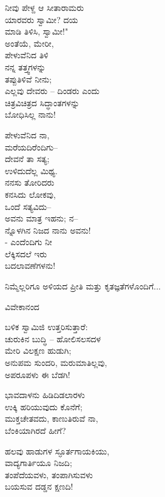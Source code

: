 \begin{myquote}
ನೀವು ಪೇಳ್ದ ಆ ಸೀತಾರಾಮರು\\ಯಾರವರು ಸ್ವಾಮೀ? ದಯ\\ಮಾಡಿ ತಿಳಿಸಿ, ಸ್ವಾಮೀ!"\\ಅಂತೆಯೆ, ಮೇರೀ,\\ಪೇಳುವೆನಿದ ತಿಳಿ\\ನನ್ನ ತತ್ತ್ವಗಳನ್ನು\\ತಪ್ಪುತಿಳಿವೆ ನೀನು;\\ಎಲ್ಲವು ದೇವರು – ದಿಂಡರು ಎಂದು\\ಚಿತ್ರವಿಚಿತ್ರದ ಸಿದ್ಧಾಂತಗಳನ್ನು\\ಬೋಧಿಸಿಲ್ಲ ನಾನು!
\end{myquote}

\begin{myquote}
ಪೇಳುವೆನಿದ ನಾ,\\ಮರೆಯದಿರೆಂದಿಗು–\\ದೇವನೆ ತಾ ಸತ್ಯ;\\ಉಳಿದುದೆಲ್ಲ ಮಿಥ್ಯ.\\ನನಸು ತೋರಿದರು\\ಕನಸಿದು ಲೋಕವು,\\ಒಂದೆ ಸತ್ಯವಿದು–\\ಅವನು ಮಾತ್ರ ಇಹನು; ನ–\\ನ್ನೊಳಗಿನ ನಿಜದ ನಾನು ಅವನು!\\- ಎಂದೆಂದಿಗು ನೀ\\ಲೆಕ್ಕಿಸದಲೆ ಇರು\\ಬದಲಾವಣೆಗಳನು!
\end{myquote}

ನಿಮ್ಮೆಲ್ಲರಿಗೂ ಅಳಿಯದ ಪ್ರೀತಿ ಮತ್ತು ಕೃತಜ್ಞತೆಗಳೊಂದಿಗೆ...

\begin{flushright}
ವಿವೇಕಾನಂದ
\end{flushright}

\begin{myquote}
ಬಳಿಕ ಸ್ವಾಮಿಜಿ ಉತ್ತರಿಸುತ್ತಾರೆ:\\ಚುರುಕಿನ ಬುದ್ಧಿ – ಹೋಲಿಸಲಸದಳ\\ಮೇರಿ ವಿಲಕ್ಷಣ ಹುಡುಗಿ;\\ಅನುಪಮ ಸುಂದರಿ, ಮರುಮಾತಿಲ್ಲವು,\\ಅಪರೂಪಳು ಈ ಬೆಡಗಿ!
\end{myquote}

\begin{myquote}
ಭಾವದಾಳನು ಹಿಡಿದಿಡಲಾರಳು\\ಉಕ್ಕಿ ಹರಿಯುವುದು ಕೊನೆಗೆ;\\ಮುಕ್ತಚೇತವದು, ಕಾಣುತಿರುವೆ ನಾ,\\ಬೆಂಕಿಯಾಗಿರದೆ ಹೀಗೆ?
\end{myquote}

\begin{myquote}
ಹಲವು ಹಾಡುಗಳ ಸ್ಫೂರ್ತಗಾಯಕಿಯು,\\ವಾದ್ಯಗಾರ್ತಿಯೂ ನಿಜದಿ;\\ತಂಪೆದೆಯವಳು, ತಂಪಾಗಿಸುವಳು\\ಬಯಸುವ ದಡ್ಡನ ಕ್ಷಣದಿ!
\end{myquote}

